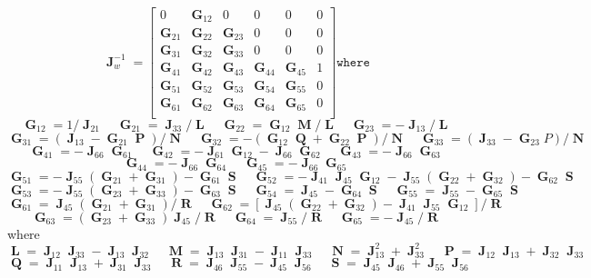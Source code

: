 \documentclass[12pt]{article}
\DeclareMathOperator{\J}{\mathbf{J}}
\DeclareMathOperator{\G}{\mathbf{G}}
\DeclareMathOperator{\LL}{\mathbf{L}}
\DeclareMathOperator{\M}{\mathbf{M}}
\DeclareMathOperator{\N}{\mathbf{N}}
\DeclareMathOperator{\p}{\mathbf{P}}
\DeclareMathOperator{\Q}{\mathbf{Q}}
\DeclareMathOperator{\R}{\mathbf{R}}
\DeclareMathOperator{\s}{\mathbf{S}}
\begin{document}
$$
\J_w^{-1} = 
\begin{bmatrix}
  0 & \G_{12} & 0 & 0 & 0 & 0\\
  \G_{21} & \G_{22} & \G_{23} & 0 & 0 & 0\\
  \G_{31} & \G_{32} & \G_{33} & 0 & 0 & 0\\
  \G_{41} & \G_{42} & \G_{43} & \G_{44} & \G_{45} & 1\\
  \G_{51} & \G_{52} & \G_{53} & \G_{54} & \G_{55} & 0\\
  \G_{61} & \G_{62} & \G_{63} & \G_{64} & \G_{65} & 0\\  
\end{bmatrix} \texttt{where}
$$ 
$$\G_{12} = 1/\J_{21} \quad \G_{21} = \J_{33}/\LL \quad \G_{22} = \G_{12}\M/\LL \quad \G_{23} = -\J_{13}/\LL$$
$$\G_{31} = (\J_{13}-\G_{21}\p)/\N \quad \G_{32} = -(\G_{12}\Q+\G_{22}\p)/\N \quad \G_{33} = (\J_{33}-\G_{23}P)/\N$$
$$\G_{41} = -\J_{66}\G_{61} \quad \G_{42} = -\J_{61}\G_{12}-\J_{66}\G_{62} \quad \G_{43} = -\J_{66}\G_{63}$$
$$\G_{44} = -\J_{66}\G_{64} \quad \G_{45} = -\J_{66}\G_{65}$$
$$\G_{51} = -\J_{55}(\G_{21} + \G_{31})-\G_{61}\s \quad \G_{52} = -\J_{41}\J_{45}\G_{12}-\J_{55}(\G_{22}+\G_{32})-\G_{62}\s$$
$$\G_{53} = -\J_{55}(\G_{23} + \G_{33})-\G_{63}\s \quad \G_{54} = \J_{45} - \G_{64}\s \quad \G_{55} = \J_{55} - \G_{65}\s$$
$$\G_{61} = \J_{45}(\G_{21} + \G_{31})/\R \quad \G_{62} = [\J_{45}(\G_{22} + \G_{32})-\J_{41}\J_{55}\G_{12}]/\R$$
$$\G_{63} = (\G_{23} + \G_{33})\J_{45}/\R \quad \G_{64} = \J_{55}/\R \quad \G_{65} = -\J_{45}/\R$$
where
$$\LL = \J_{12}\J_{33}-\J_{13}\J_{32} \quad \M = \J_{13}\J_{31}-\J_{11}\J_{33} \quad \N = \J_{13}^2+\J_{33}^2 \quad \p = \J_{12}\J_{13}+\J_{32}\J_{33}$$
$$\Q = \J_{11}\J_{13}+\J_{31}\J_{33} \quad \R = \J_{46}\J_{55}-\J_{45}\J_{56} \quad \s = \J_{45}\J_{46}+\J_{55}\J_{56}$$
\end{document}
